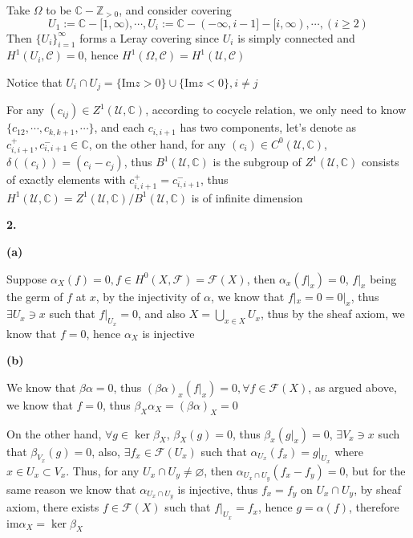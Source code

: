 \documentclass[12pt]{article}
\begin{document}
Take $\Omega$ to be $\mathbb{C}-\mathbb{Z}_{>0}$, and consider covering$$U_{1}:=\mathbb{C}-[1,\infty), \cdots, U_{i}:=\mathbb{C}-(-\infty,i-1]-[i,\infty), \cdots, \left(i\geq 2\right)$$Then $\{U_{i}\}_{i=1}^{\infty}$ forms a Leray covering since $U_{i}$ is simply connected and $H^{1}(U_{i},\mathcal{C})=0$, hence $H^{1}(\Omega,\mathcal{C})=H^{1}(\mathcal{U},\mathcal{C})$ \par
Notice that $U_{i}\cap U_{j}=\{\mathrm{Im}z>0\}\cup\{\mathrm{Im}z<0\}, i\neq j$ \par
For any $(c_{ij})\in Z^{1}(\mathcal{U},\mathbb{C})$, according to cocycle relation, we only need to know $\{c_{12},\cdots,c_{k,k+1},\cdots\}$, and each $c_{i,i+1}$ has two components, let's denote as $c_{i,i+1}^{+},c_{i,i+1}^{-}\in \mathbb{C}$, on the other hand, for any $(c_{i})\in C^{0}(\mathcal{U},\mathbb{C})$, $\delta\left((c_{i})\right)=(c_{i}-c_{j})$, thus $B^{1}(\mathcal{U},\mathbb{C})$ is the subgroup of $Z^{1}(\mathcal{U},\mathbb{C})$ consists of exactly elements with $c_{i,i+1}^{+}=c_{i,i+1}^{-}$, thus $H^{1}(\mathcal{U},\mathbb{C})=Z^{1}(\mathcal{U},\mathbb{C})/B^{1}(\mathcal{U},\mathbb{C})$ is of infinite dimension \par
\textbf{2.} \par
\textbf{(a)} \par
Suppose $\alpha_{X}(f)=0, f\in H^{0}(X,\mathcal{F})=\mathcal{F}(X)$, then $\alpha_{x}(f|_{x})=0$, $f|_{x}$ being the germ of $f$ at $x$, by the injectivity of $\alpha$, we know that $f|_{x}=0=0|_{x}$, thus $\exists U_{x} \ni x$ such that $f|_{U_{x}}=0$, and also $X=\bigcup_{x\in X} U_{x}$, thus by the sheaf axiom, we know that $f=0$, hence $\alpha_{X}$ is injective \par
\textbf{(b)} \par
We know that $\beta\alpha=0$, thus $\left(\beta\alpha\right)_{x}(f|_{x})=0, \forall f\in \mathcal{F}(X)$, as argued above, we know that $f=0$, thus $\beta_{X}\alpha_{X}=\left(\beta\alpha\right)_{X}=0$ \par
On the other hand, $\forall g\in \ker\beta_{X}$, $\beta_{X}(g)=0$, thus $\beta_{x}(g|_{x})=0$, $\exists V_{x}\ni x$ such that $\beta_{V_{x}}(g)=0$, also, $\exists f_{x}\in \mathcal{F}(U_{x})$ such that $\alpha_{U_{x}}(f_{x})=g|_{U_{x}}$ where $x\in U_{x}\subset V_{x}$. Thus, for any $U_{x}\cap U_{y}\neq \varnothing$, then $\alpha_{U_{x}\cap U_{y}}(f_{x}-f_{y})=0$, but for the same reason we know that $\alpha_{U_{x}\cap U_{y}}$ is injective, thus $f_{x}=f_{y}$ on $U_{x}\cap U_{y}$, by sheaf axiom, there exists $f\in \mathcal{F}(X)$ such that $f|_{U_{x}}=f_{x}$, hence $g=\alpha(f)$, therefore $\mathrm{im}\alpha_{X}=\ker\beta_{X}$ \par
\end{document}
